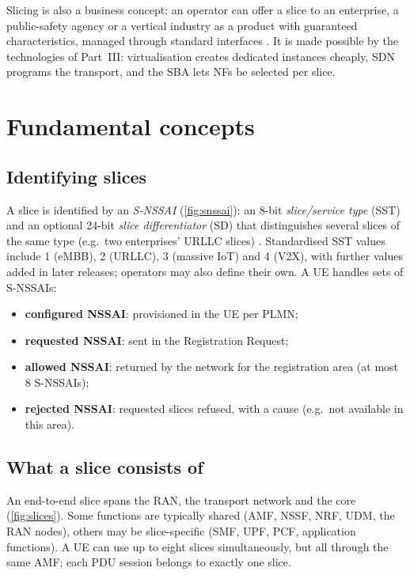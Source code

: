 \documentclass[11pt,a4paper]{article}
\begin{document}
Slicing is also a business concept: an operator can offer a slice to an enterprise, a public-safety agency or a vertical industry as a
product with guaranteed characteristics, managed through standard interfaces \cite{ts28530}. It is made possible by the technologies of
Part~III: virtualisation creates dedicated instances cheaply, SDN programs the transport, and the SBA lets NFs be selected per slice.

\section{Fundamental concepts}

\subsection{Identifying slices}
A slice is identified by an \emph{S-NSSAI} (\cref{fig:snssai}): an 8-bit \emph{slice/service type} (SST) and an optional 24-bit
\emph{slice differentiator} (SD) that distinguishes several slices of the same type (e.g.\ two enterprises' URLLC slices) \cite{ts23003}.
Standardised SST values include 1 (eMBB), 2 (URLLC), 3 (massive IoT) and 4 (V2X), with further values added in later releases;
operators may also define their own. A UE handles sets of S-NSSAIs:
\begin{itemize}
  \item \textbf{configured NSSAI}: provisioned in the UE per PLMN;
  \item \textbf{requested NSSAI}: sent in the Registration Request;
  \item \textbf{allowed NSSAI}: returned by the network for the registration area (at most 8 S-NSSAIs);
  \item \textbf{rejected NSSAI}: requested slices refused, with a cause (e.g.\ not available in this area).
\end{itemize}

\begin{acnfigure}
  \caption{S-NSSAI structure and the NSSAI sets exchanged at registration.}
  \label{fig:snssai}
\end{acnfigure}

\subsection{What a slice consists of}
An end-to-end slice spans the RAN, the transport network and the core (\cref{fig:slices}). Some functions are typically shared (AMF,
NSSF, NRF, UDM, the RAN nodes), others may be slice-specific (SMF, UPF, PCF, application functions). A UE can use up to eight slices
simultaneously, but all through the same AMF; each PDU session belongs to exactly one slice.
\end{document}
